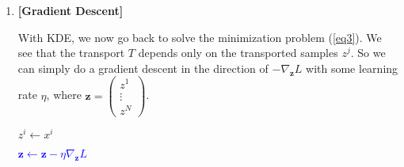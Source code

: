 \documentclass[11pt]{article}
\begin{document}
\begin{enumerate}
    \item {\bf [Gradient Descent]}
    
    With KDE, we now go back to solve the minimization problem (\ref{eq3}).
    We see that the transport $T$ depends only on the transported samples $z^j$. So we can simply do a gradient descent in the direction of $-\nabla_{\mathbf{z}} L$ with some learning rate $\eta$, where $\mathbf{z} = \begin{pmatrix}
    z^1 \\ \vdots \\ z^N
    \end{pmatrix}$.
    \begin{algorithm}[h]
    \caption{Gradient Descent w.r.t $\mathbf{z}$}
    \begin{algorithmic}
    \State $z^i \gets x^i$
    \EndFor
        
    \textcolor{blue}{\State $\mathbf{z} \gets \mathbf{z} - \eta \nabla_{\mathbf{z}} L$} 
    \EndWhile
        
    \end{algorithmic}
    \end{algorithm}
        
    
\end{enumerate}
\end{document}
